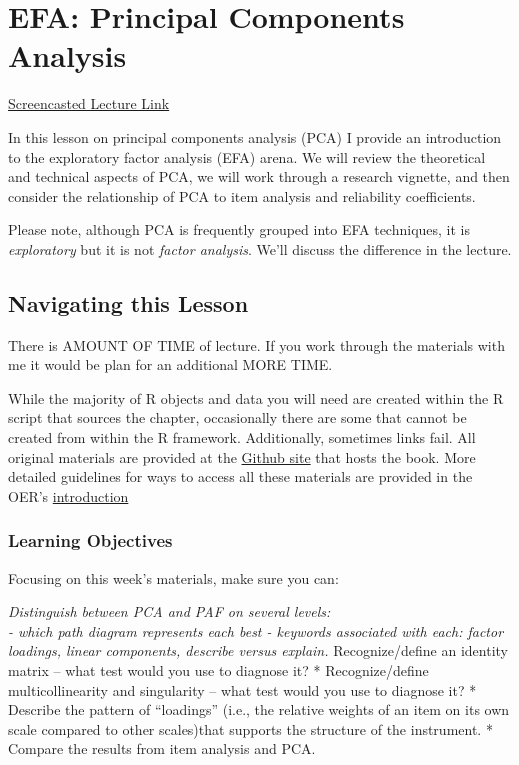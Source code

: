 \documentclass[
  english,
]{book}
\begin{document}
\hypertarget{PCA}{%
\chapter{EFA: Principal Components Analysis}\label{PCA}}

\href{link}{Screencasted Lecture Link}

In this lesson on principal components analysis (PCA) I provide an introduction to the exploratory factor analysis (EFA) arena. We will review the theoretical and technical aspects of PCA, we will work through a research vignette, and then consider the relationship of PCA to item analysis and reliability coefficients.

Please note, although PCA is frequently grouped into EFA techniques, it is \emph{exploratory} but it is not \emph{factor analysis}. We'll discuss the difference in the lecture.

\hypertarget{navigating-this-lesson-6}{%
\section{Navigating this Lesson}\label{navigating-this-lesson-6}}

There is AMOUNT OF TIME of lecture. If you work through the materials with me it would be plan for an additional MORE TIME.

While the majority of R objects and data you will need are created within the R script that sources the chapter, occasionally there are some that cannot be created from within the R framework. Additionally, sometimes links fail. All original materials are provided at the \href{https://github.com/lhbikos/ReC_Psychometrics}{Github site} that hosts the book. More detailed guidelines for ways to access all these materials are provided in the OER's \protect\hyperlink{ReCintro}{introduction}

\hypertarget{learning-objectives-6}{%
\subsection{Learning Objectives}\label{learning-objectives-6}}

Focusing on this week's materials, make sure you can:

\emph{Distinguish between PCA and PAF on several levels:\\
- which path diagram represents each best
- keywords associated with each: factor loadings, linear components, describe versus explain.
} Recognize/define an identity matrix -- what test would you use to diagnose it?
* Recognize/define multicollinearity and singularity -- what test would you use to diagnose it?
* Describe the pattern of ``loadings'' (i.e., the relative weights of an item on its own scale compared to other scales)that supports the structure of the instrument.
* Compare the results from item analysis and PCA.
\end{document}
